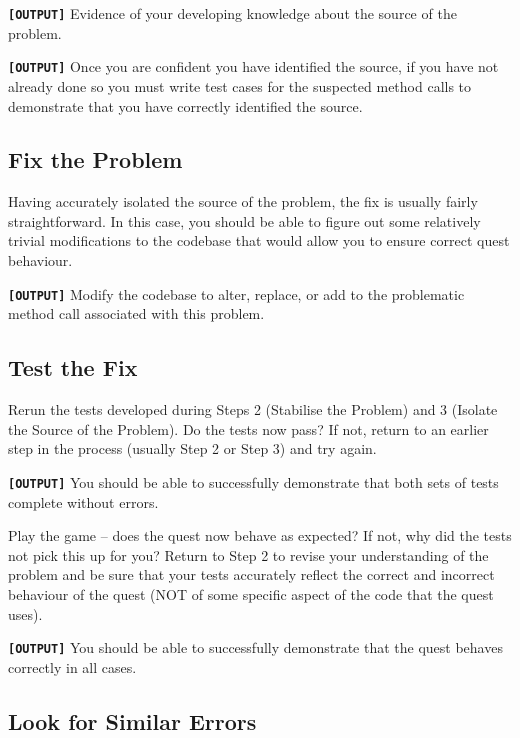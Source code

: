 \documentclass[
]{book}
\begin{document}
\textbf{\texttt{{[}OUTPUT{]}}} Evidence of your developing knowledge about the source of the problem.

\textbf{\texttt{{[}OUTPUT{]}}} Once you are confident you have identified the source, if you have not already done so you must write test cases for the suspected method calls to demonstrate that you have correctly identified the source.

\hypertarget{fixit}{%
\subsection{Fix the Problem}\label{fixit}}

Having accurately isolated the source of the problem, the fix is usually fairly straightforward. In this case, you should be able to figure out some relatively trivial modifications to the codebase that would allow you to ensure correct quest behaviour.

\textbf{\texttt{{[}OUTPUT{]}}} Modify the codebase to alter, replace, or add to the problematic method call associated with this problem.

\hypertarget{testfix}{%
\subsection{Test the Fix}\label{testfix}}

Rerun the tests developed during Steps 2 (Stabilise the Problem) and 3 (Isolate the Source of the Problem). Do the tests now pass? If not, return to an earlier step in the process (usually Step 2 or Step 3) and try again.

\textbf{\texttt{{[}OUTPUT{]}}} You should be able to successfully demonstrate that both sets of tests complete without errors.

Play the game -- does the quest now behave as expected? If not, why did the tests not pick this up for you? Return to Step 2 to revise your understanding of the problem and be sure that your tests accurately reflect the correct and incorrect behaviour of the quest (NOT of some specific aspect of the code that the quest uses).

\textbf{\texttt{{[}OUTPUT{]}}} You should be able to successfully demonstrate that the quest behaves correctly in all cases.

\hypertarget{similarity}{%
\subsection{Look for Similar Errors}\label{similarity}}
\end{document}
